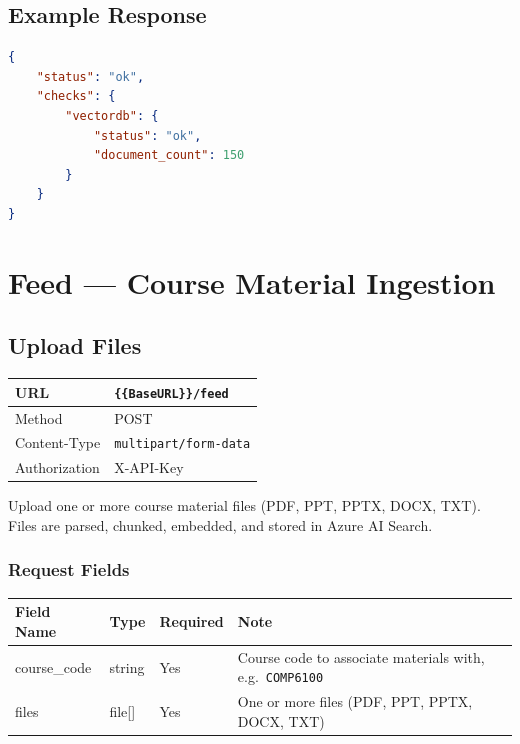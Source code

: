 \documentclass[11pt]{article}
\begin{document}
\subsection{Example Response}

\begin{lstlisting}[language=json]
{
    "status": "ok",
    "checks": {
        "vectordb": {
            "status": "ok",
            "document_count": 150
        }
    }
}
\end{lstlisting}

\section{Feed — Course Material Ingestion}

\subsection{Upload Files}

\begin{tabular}{|H{3cm}|p{12.1cm}|}
  \hline
  URL           & \texttt{\{\{BaseURL\}\}/feed} \\
  \hline
  Method        & POST \\
  \hline
  Content-Type  & \texttt{multipart/form-data} \\
  \hline
  Authorization & X-API-Key \\
  \hline
\end{tabular}

Upload one or more course material files (PDF, PPT, PPTX, DOCX, TXT). Files
are parsed, chunked, embedded, and stored in Azure AI Search.

\subsubsection{Request Fields}

\begin{longtable}{|p{3.5cm}|p{2cm}|p{2cm}|p{6.8cm}|}
  \hline
  \rowcolor{tabheader}
  \textbf{Field Name} & \textbf{Type} & \textbf{Required} & \textbf{Note} \\
  \hline
  \endhead
  course\_code & string & Yes & Course code to associate materials with, e.g.\ \texttt{COMP6100} \\
  \hline
  files        & file[] & Yes & One or more files (PDF, PPT, PPTX, DOCX, TXT) \\
  \hline
\end{longtable}
\end{document}

